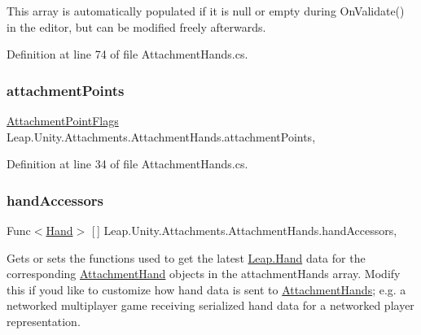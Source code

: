 This array is automatically populated if it is null or empty during On\+Validate() in the editor, but can be modified freely afterwards. 

Definition at line 74 of file Attachment\+Hands.\+cs.

\mbox{\label{class_leap_1_1_unity_1_1_attachments_1_1_attachment_hands_aa5e61a917e83531792e87dee55f5ffd5}} 
\subsubsection{\texorpdfstring{attachmentPoints}{attachmentPoints}}
{\footnotesize\ttfamily \mbox{\hyperlink{namespace_leap_1_1_unity_1_1_attachments_a4b32b38f722ad110fcd5a817256e09ab}{Attachment\+Point\+Flags}} Leap.\+Unity.\+Attachments.\+Attachment\+Hands.\+attachment\+Points\hspace{0.3cm}{\ttfamily [get]}, {\ttfamily [set]}}



Definition at line 34 of file Attachment\+Hands.\+cs.

\mbox{\label{class_leap_1_1_unity_1_1_attachments_1_1_attachment_hands_a7a1f75d54d1823bae8829a9e6e49c176}} 
\subsubsection{\texorpdfstring{handAccessors}{handAccessors}}
{\footnotesize\ttfamily Func$<$\mbox{\hyperlink{class_leap_1_1_hand}{Hand}}$>$ \mbox{[}$\,$\mbox{]} Leap.\+Unity.\+Attachments.\+Attachment\+Hands.\+hand\+Accessors\hspace{0.3cm}{\ttfamily [get]}, {\ttfamily [set]}}



Gets or sets the functions used to get the latest \mbox{\hyperlink{class_leap_1_1_hand}{Leap.\+Hand}} data for the corresponding \mbox{\hyperlink{class_leap_1_1_unity_1_1_attachments_1_1_attachment_hand}{Attachment\+Hand}} objects in the attachment\+Hands array. Modify this if you\textquotesingle{}d like to customize how hand data is sent to \mbox{\hyperlink{class_leap_1_1_unity_1_1_attachments_1_1_attachment_hands}{Attachment\+Hands}}; e.\+g. a networked multiplayer game receiving serialized hand data for a networked player representation. 

